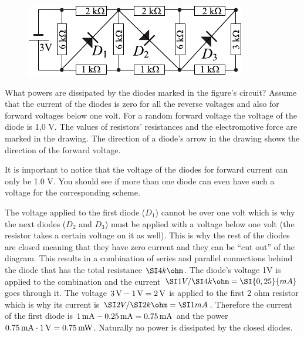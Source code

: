 {\ifEngStatement
\begin{figure}
\includegraphics[width=\linewidth]{2012-lahg-08-dioodid}
\end{figure}
What powers are dissipated by the diodes marked in the figure’s circuit? Assume that the current of the diodes is zero for all the reverse voltages and also for forward voltages below one volt. For a random forward voltage the voltage of the diode is 1,0 V. The values of resistors’ resistances and the electromotive force are marked in the drawing. The direction of a diode’s arrow in the drawing shows the direction of the forward voltage.
\fi


\ifEngHint
It is important to notice that the voltage of the diodes for forward current can only be 1.0 V. You should see if more than one diode can even have such a voltage for the corresponding scheme.
\fi


\ifEngSolution
The voltage applied to the first diode ($D_1$) cannot be over one volt which is why the next diodes ($D_2$ and $D_3$) must be applied with a voltage below one volt (the resistor takes a certain voltage on it as well). This is why the rest of the diodes are closed meaning that they have zero current and they can be “cut out” of the diagram. This results in a combination of series and parallel connections behind the diode that has the total resistance $\SI 4{k\ohm}$. The diode’s voltage 1V is applied to the combination and the current $\SI 1V /\SI 4{k\ohm}= \SI {0,25}{mA}$ goes through it. The voltage $\SI 3V-\SI 1V=\SI 2V$ is applied to the first 2 ohm resistor which is why its current is $\SI 2V/\SI 2{k\ohm}=\SI 1{mA}$. Therefore the current of the first diode is $\SI 1{mA}-\SI {0,25}{mA}=\SI{0,75}{mA}$ and the power $\SI{0,75}{mA}\cdot \SI 1V=\SI{0,75}{mW}$. Naturally no power is dissipated by the closed diodes.
\fi
}
